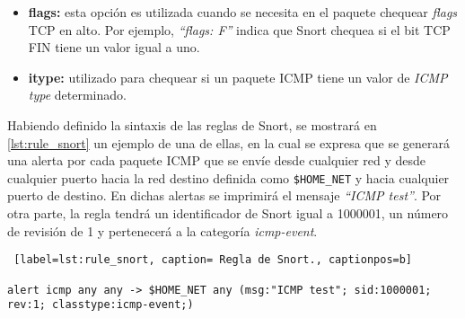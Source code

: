 \begin{itemize}
\begin{itemize}
\item{\textbf{count:}} debe ser un valor distinto de cero y expresa una cantidad de coincidencias con la regla en el intervalo de tiempo definido por el subcampo \textit{seconds}.
\item{\textbf{seconds:}} debe ser un valor distinto de cero y define el intervalo de tiempo en segundos durante los cuales un contador interno del IDS se va a poder incrementar frente a cada coincidencia con la regla. Finalizado este intervalo, dicho contador se resetea.
\end{itemize}
\item{\textbf{flags:}} esta opción es utilizada cuando se necesita en el paquete chequear \textit{flags} TCP en alto. Por ejemplo, \textit{“flags: F”} indica que Snort chequea si el bit TCP FIN tiene un valor igual a uno.
\item{\textbf{itype:}} utilizado para chequear si un paquete ICMP tiene un valor de \textit{ICMP type} determinado.
\end{itemize}

Habiendo definido la sintaxis de las reglas de Snort, se mostrará en \ref{lst:rule_snort} un ejemplo de una de ellas, en la cual se expresa que se generará una alerta por cada paquete ICMP que se envíe desde cualquier red y desde cualquier puerto hacia la red destino definida como \texttt{\$HOME\_NET} y hacia cualquier puerto de destino. En dichas alertas se imprimirá el mensaje \textit{“ICMP test”}. Por otra parte, la regla tendrá un identificador de Snort igual a 1000001, un número de revisión de 1 y pertenecerá a la categoría \textit{icmp-event}.\\


\begin{lstlisting} [label=lst:rule_snort, caption= Regla de Snort., captionpos=b]

alert icmp any any -> $HOME_NET any (msg:"ICMP test"; sid:1000001; rev:1; classtype:icmp-event;)

\end{lstlisting}  


